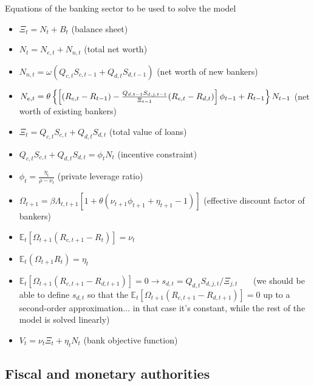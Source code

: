 \documentclass{article}
\begin{document}
Equations of the banking sector to be used to solve the model

\begin{itemize}
\item $\Xi _{t}=N_{t}+B_{t}$ (balance sheet)

\item $N_{t}=N_{e,t}+N_{n,t}$ (total net worth)

\item $N_{n,t}=\omega (Q_{c,t}S_{c,t-1}+Q_{d,t}S_{d,t-1})$ (net worth of new
bankers)

\item $N_{e,t}=\theta \left\{ \left[ (R_{c,t}-R_{t-1})-\frac{%
Q_{d,t-1}S_{d,j,t-1}}{\Xi _{t-1}}(R_{c,t}-R_{d,t})\right] \phi
_{t-1}+R_{t-1}\right\} N_{t-1}$ (net worth of existing bankers)

\item $\Xi _{t}=Q_{c,t}S_{c,t}+Q_{d,t}S_{d,t}$ (total value of loans)

\item $Q_{c,t}S_{c,t}+Q_{d,t}S_{d,t}=\phi _{t}N_{t}$ (incentive constraint)

\item $\phi _{t}=\frac{\eta _{t}}{\rho -\nu _{t}}$ (private leverage ratio)

\item $\Omega _{t+1}=\beta \Lambda _{t,t+1}\left[ 1+\theta (\nu _{t+1}\phi
_{t+1}+\eta _{t+1}-1)\right] $ (effective discount factor of bankers)

\item $\mathbb{E}_{t}\left[ \Omega _{t+1}(R_{c,t+1}-R_{t})\right] =\nu _{t}$

\item $\mathbb{E}_{t}\left( \Omega _{t+1}R_{t}\right) =\eta _{t}$

\item $\mathbb{E}_{t}\left[ \Omega _{t+1}(R_{c,t+1}-R_{d,t+1})\right]
=0\rightarrow s_{d,t}=Q_{d,t}S_{d,j,t}/\Xi _{j,t}$ \ \ \ (we should be able
to define $s_{d,t}$ so that the $\mathbb{E}_{t}\left[ \Omega
_{t+1}(R_{c,t+1}-R_{d,t+1})\right] =0$ up to a second-order approximation...
in that case it's constant, while the rest of the model is solved linearly)

\item $V_{t}=\nu _{t}\Xi _{t}+\eta _{t}N_{t}$ (bank objective function)
\end{itemize}

\bigskip

\subsection{Fiscal and monetary authorities}
\end{document}
